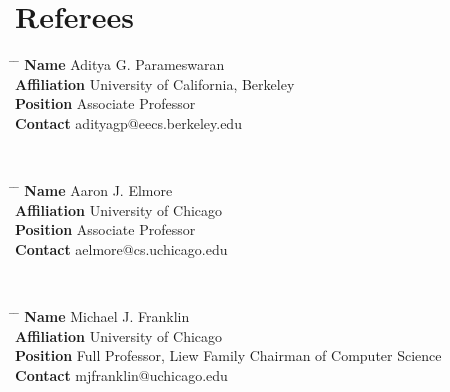 \documentclass[10pt]{article} %
\begin{document}


\section{Referees}

\parbox{0.5\textwidth}{ %
\begin{tabbing}
\hspace{2cm} \= \hspace{4cm} \= \kill %
{\bf Name} \> Aditya G. Parameswaran \\ %
{\bf Affiliation} \> University of California, Berkeley \\ %
{\bf Position} \> Associate Professor \\ %
{\bf Contact} \> adityagp@eecs.berkeley.edu %
\end{tabbing}}
\\
\parbox{0.5\textwidth}{ %
\begin{tabbing}
\hspace{2cm} \= \hspace{4cm} \= \kill %
{\bf Name} \> Aaron J. Elmore \\ %
{\bf Affiliation} \> University of Chicago \\ %
{\bf Position} \> Associate Professor \\ %
{\bf Contact} \> aelmore@cs.uchicago.edu %
\end{tabbing}}
\\
\parbox{0.5\textwidth}{ %
\begin{tabbing}
\hspace{2cm} \= \hspace{4cm} \= \kill %
{\bf Name} \> Michael J. Franklin \\ %
{\bf Affiliation} \> University of Chicago \\ %
{\bf Position} \> Full Professor, Liew Family Chairman of Computer Science \\ %
{\bf Contact} \> mjfranklin@uchicago.edu %
\end{tabbing}}
\end{document}
